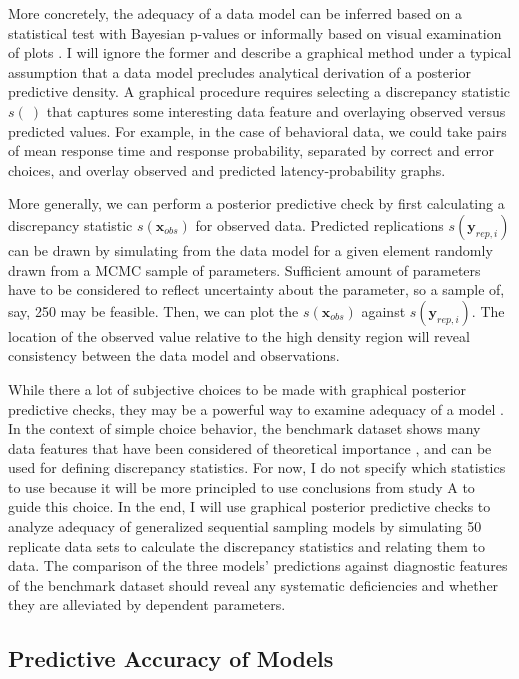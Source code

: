 \documentclass[12pt]{report}
\begin{document}
More concretely, the adequacy of a data model can be inferred based on a statistical test with Bayesian p-values or informally based on visual examination of plots \citep{GelCar2013}. I will ignore the former and describe a graphical method under a typical assumption that a data model precludes analytical derivation of a posterior predictive density. A graphical procedure requires selecting a discrepancy statistic $s(\:)$ that captures some interesting data feature and overlaying observed versus predicted values. For
example, in the case of behavioral data, we could take pairs of mean response time and response probability, separated by correct and error choices, and overlay observed and predicted latency-probability graphs.
 
More generally, we can perform a posterior predictive check by first calculating a discrepancy statistic
$s(\boldsymbol{x}_{obs})$ for observed data. Predicted replications $s(\boldsymbol{y}_{rep,i})$ can be drawn by simulating from the data model for a given element randomly drawn from a MCMC sample of parameters. Sufficient amount of parameters have to be considered to reflect uncertainty about the parameter, so a sample of, say, 250
may be feasible. Then, we can plot the
$s(\boldsymbol{x}_{obs})$ against $s(\boldsymbol{y}_{rep,i})$. The location of the observed value relative to the
high density region will reveal consistency between the data model and observations. 

While there a lot of subjective choices to be made with graphical posterior predictive checks, they may be a powerful way to examine adequacy of a model \citep{GelCar2013}. In the context of simple choice behavior, the \citet{RatRou1998} benchmark dataset shows many data features that have been considered of theoretical importance \citep{Vic1979,Luc1986}, and can be used for defining discrepancy statistics. For now, I do not specify which statistics to use because it will be more principled to use conclusions from study A to guide this choice. In the end, I will use graphical posterior predictive checks to analyze adequacy of generalized sequential sampling models by simulating 50 replicate data sets to calculate the discrepancy statistics and relating them to data. The comparison of the three models' predictions against diagnostic features of the benchmark dataset should reveal any systematic deficiencies and whether they are alleviated by dependent parameters.

\subsection{Predictive Accuracy of Models}
\end{document}
